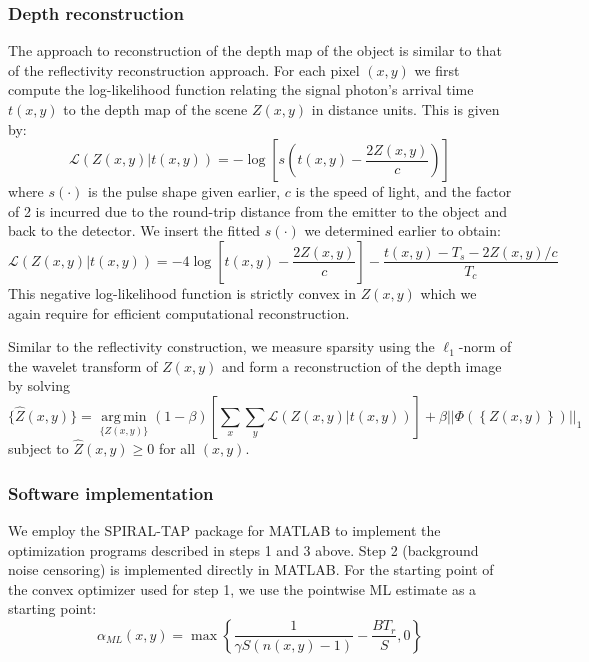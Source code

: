 \subsubsection{Depth reconstruction}
The approach to reconstruction of the depth map of the object is similar to that of the reflectivity reconstruction approach. For each pixel $(x,y)$ we first compute the log-likelihood function relating the signal photon's arrival time $t(x,y)$ to the depth map of the scene $Z(x,y)$ in distance units. This is given by:
\begin{equation}
\mathcal{L}(Z(x,y) | t(x,y)) = -\log\left[ s(t(x,y) - \frac{2Z(x,y)}{c}) \right]
\end{equation}
where $s(\cdot)$ is the pulse shape given earlier, $c$ is the speed of light, and the factor of 2 is incurred due to the round-trip distance from the emitter to the object and back to the detector. We insert the fitted $s(\cdot)$ we determined earlier to obtain:
\begin{equation}
\mathcal{L}(Z(x,y) | t(x,y)) = -4\log\left[ t(x,y) - \frac{2Z(x,y)}{c} \right] - \frac{t(x,y) - T_s - 2Z(x,y)/c}{T_c}
\end{equation}
This negative log-likelihood function is strictly convex in $Z(x,y)$ which we again require for efficient computational reconstruction.

Similar to the reflectivity construction, we measure sparsity using the $\ell_1$-norm of the wavelet transform of $Z(x,y)$ and form a reconstruction of the depth image by solving
\begin{equation}
\{ \hat{Z}(x,y) \} = \underset{\{Z(x,y)\}}{\operatorname{arg\,min}} (1 - \beta) \left[ \sum_x \sum_y \mathcal{L}( Z(x,y) | t(x,y) ) \right] + \beta || \Phi\left(\left\{ Z(x,y) \right\}\right) ||_1
\end{equation}
subject to $\hat{Z}(x,y) \geq 0$ for all $(x,y)$.

\subsubsection{Software implementation}
We employ the SPIRAL-TAP package for MATLAB \cite{harmany-spiral} to implement the optimization programs described in steps 1 and 3 above. Step 2 (background noise censoring) is implemented directly in MATLAB. For the starting point of the convex optimizer used for step 1, we use the pointwise ML estimate as a starting point:
\begin{equation}
\alpha_{ML}(x,y) = \operatorname{max}\left\{ \frac{1}{\gamma S (n(x,y) - 1)} - \frac{BT_r}{S}, 0 \right\}
\end{equation}

